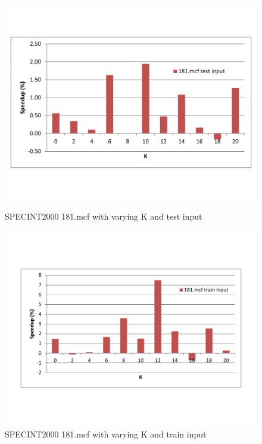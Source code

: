 \documentclass[11pt]{article}
\begin{document}
  \begin{figure}[h]
    \begin{minipage} [t] {8.6cm}
      \includegraphics[scale=0.315]{./results/181_best_perf}
      \caption{SPECINT2000 181.mcf with varying K and test input\label{181}}
    \end{minipage}
    \begin{minipage} [t] {8.5cm}
      \includegraphics[scale=0.35]{./results/181train}
      \caption{SPECINT2000 181.mcf with varying K and train input\label{181}}
    \end{minipage}
  \end{figure} 
\end{document}
